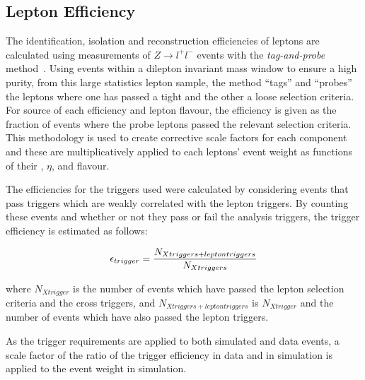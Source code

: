 
\subsection{Lepton Efficiency}\label{subsec:leptonRecoSFs}
The identification, isolation and reconstruction efficiencies of leptons are calculated using measurements of $Z \rightarrow l^{+} l ^{-}$ events with the \emph{tag-and-probe} method~\cite{CMS:2008rxa}.
Using events within a dilepton invariant mass window to ensure a high purity, from this large statistics lepton sample, the method ``tags'' and ``probes'' the leptons where one has passed a tight and the other a loose selection criteria.
For source of each efficiency and lepton flavour, the efficiency is given as the fraction of events where the probe leptons passed the relevant selection criteria.
This methodology is used to create corrective scale factors for each component and these are multiplicatively applied to each leptons' event weight as functions of their \pt, $\eta$, and flavour.


The efficiencies for the triggers used were calculated by considering events that pass triggers which are weakly correlated with the lepton triggers.
By counting these events and whether or not they pass or fail the analysis triggers, the trigger efficiency is estimated as follows:

\begin{equation}
\epsilon_{trigger} = \frac{N_{X triggers + lepton triggers}}{N_{X triggers}} \\
\end{equation}

where $N_{X trigger}$ is the number of events which have passed the lepton selection criteria and the cross triggers, and $N_{X triggers + lepton triggers}$ is $N_{X trigger}$ and the number of events which have also passed the lepton triggers.

As the trigger requirements are applied to both simulated and data events, a scale factor of the ratio of the trigger efficiency in data and in simulation is applied to the event weight in simulation.

